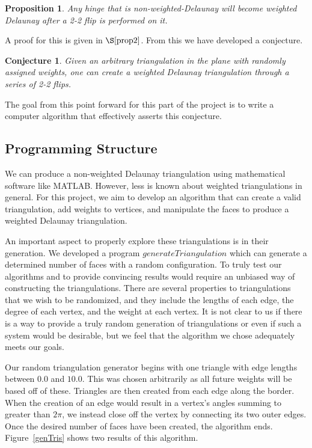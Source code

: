 \documentclass[12pt]{article}
\newtheorem{proposition}[theorem]{Proposition}
\newtheorem{conjecture}[theorem]{Conjecture}
\begin{document}
\begin{proposition}
\label{weidelprop}
Any hinge that is non-weighted-Delaunay will become weighted Delaunay after a 2-2 flip is performed on it.
\end{proposition}

 A proof for this is given in $\S\ref{prop2}$. From this we have developed a conjecture.

\begin{conjecture}
Given an arbitrary triangulation in the plane with randomly assigned weights, one can create a weighted Delaunay triangulation through a series of 2-2 flips.
\end{conjecture}

 The goal from this point forward for this part of the project is to write a computer algorithm that effectively asserts this conjecture.

\subsection{Programming Structure}
 We can produce a non-weighted Delaunay triangulation using mathematical software like MATLAB. However, less is known about weighted triangulations in general. For this project, we aim to develop an algorithm that can create a valid triangulation, add weights to vertices, and manipulate the faces to produce a weighted Delaunay triangulation.

 An important aspect to properly explore these triangulations is in their generation. We developed a program $generateTriangulation$ which can generate a determined number of faces with a random configuration. To truly test our algorithms and to provide convincing results would require an unbiased way of constructing the triangulations. There are several properties to triangulations that we wish to be randomized, and they include the lengths of each edge, the degree of each vertex, and the weight at each vertex. It is not clear to us if there is a way to provide a truly random generation of triangulations or even if such a system would be desirable, but we feel that the algorithm we chose adequately meets our goals.

 Our random triangulation generator begins with one triangle with edge lengths between $0.0$ and $10.0$. This was chosen arbitrarily as all future weights will be based off of these. Triangles are then created from each edge along the border. When the creation of an edge would result in a vertex's angles summing to greater than $2\pi$, we instead close off the vertex by connecting its two outer edges. Once the desired number of faces have been created, the algorithm ends. Figure~\ref{genTris} shows two results of this algorithm.
\end{document}
